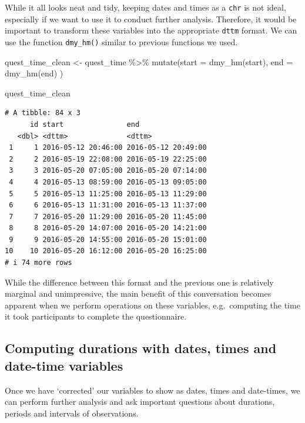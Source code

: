 \documentclass[
  letterpaper,
]{krantz}
\makeatletter
\newenvironment{Shaded}{\begin{snugshade}}{\end{snugshade}}
\newcommand{\AttributeTok}[1]{\textcolor[rgb]{0.40,0.45,0.13}{#1}}
\newcommand{\FunctionTok}[1]{\textcolor[rgb]{0.28,0.35,0.67}{#1}}
\newcommand{\NormalTok}[1]{\textcolor[rgb]{0.00,0.23,0.31}{#1}}
\newcommand{\OtherTok}[1]{\textcolor[rgb]{0.00,0.23,0.31}{#1}}
\newcommand{\SpecialCharTok}[1]{\textcolor[rgb]{0.37,0.37,0.37}{#1}}
\newenvironment{kframe}{%
\medskip{}
\setlength{\fboxsep}{.8em}
 \def\at@end@of@kframe{}%
 \ifinner\ifhmode%
  \def\at@end@of@kframe{\end{minipage}}%
  \begin{minipage}{\columnwidth}%
 \fi\fi%
 \def\FrameCommand##1{\hskip\@totalleftmargin \hskip-\fboxsep
 \colorbox{shadecolor}{##1}\hskip-\fboxsep
     \hskip-\linewidth \hskip-\@totalleftmargin \hskip\columnwidth}%
 \MakeFramed {\advance\hsize-\width
   \@totalleftmargin\z@ \linewidth\hsize
   \@setminipage}}%
 {\par\unskip\endMakeFramed%
 \at@end@of@kframe}
\renewenvironment{Shaded}{\begin{kframe}}{\end{kframe}}
\makeatother
\begin{document}
While it all looks neat and tidy, keeping dates and times as a
\texttt{chr} is not ideal, especially if we want to use it to conduct
further analysis. Therefore, it would be important to transform these
variables into the appropriate \texttt{dttm} format. We can use the
function \texttt{dmy\_hm()} similar to previous functions we used.

\begin{Shaded}
\begin{Highlighting}[]
\NormalTok{quest\_time\_clean }\OtherTok{\textless{}{-}}
\NormalTok{  quest\_time }\SpecialCharTok{\%\textgreater{}\%}
  \FunctionTok{mutate}\NormalTok{(}\AttributeTok{start =} \FunctionTok{dmy\_hm}\NormalTok{(start),}
         \AttributeTok{end =} \FunctionTok{dmy\_hm}\NormalTok{(end)}
\NormalTok{         )}

\NormalTok{quest\_time\_clean}
\end{Highlighting}
\end{Shaded}

\begin{verbatim}
# A tibble: 84 x 3
      id start               end                
   <dbl> <dttm>              <dttm>             
 1     1 2016-05-12 20:46:00 2016-05-12 20:49:00
 2     2 2016-05-19 22:08:00 2016-05-19 22:25:00
 3     3 2016-05-20 07:05:00 2016-05-20 07:14:00
 4     4 2016-05-13 08:59:00 2016-05-13 09:05:00
 5     5 2016-05-13 11:25:00 2016-05-13 11:29:00
 6     6 2016-05-13 11:31:00 2016-05-13 11:37:00
 7     7 2016-05-20 11:29:00 2016-05-20 11:45:00
 8     8 2016-05-20 14:07:00 2016-05-20 14:21:00
 9     9 2016-05-20 14:55:00 2016-05-20 15:01:00
10    10 2016-05-20 16:12:00 2016-05-20 16:25:00
# i 74 more rows
\end{verbatim}

While the difference between this format and the previous one is
relatively marginal and unimpressive, the main benefit of this
conversation becomes apparent when we perform operations on these
variables, e.g.~computing the time it took participants to complete the
questionnaire.

\subsection{Computing durations with dates, times and date-time
variables}\label{computation-dates-times}

Once we have `corrected' our variables to show as dates, times and
date-times, we can perform further analysis and ask important questions
about durations, periods and intervals of observations.
\end{document}
